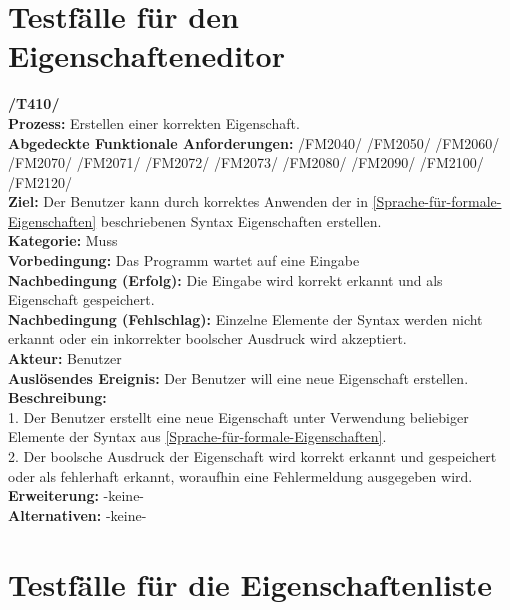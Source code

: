 \documentclass[a4paper]{scrreprt}
\begin{document}
\section{Testfälle für den Eigenschafteneditor}
\textbf{/T410/} \\
\textbf{Prozess:} Erstellen einer korrekten Eigenschaft. \\
\textbf{Abgedeckte Funktionale Anforderungen:} /FM2040/ /FM2050/ /FM2060/ /FM2070/ /FM2071/ /FM2072/ /FM2073/ /FM2080/ /FM2090/ /FM2100/ /FM2120/ \\
\textbf{Ziel:} Der Benutzer kann durch korrektes Anwenden der in \ref{Sprache-für-formale-Eigenschaften} beschriebenen Syntax Eigenschaften erstellen. \\
\textbf{Kategorie:} Muss\\
\textbf{Vorbedingung:} Das Programm wartet auf eine Eingabe\\
\textbf{Nachbedingung (Erfolg):} Die Eingabe wird korrekt erkannt und als Eigenschaft gespeichert. \\
\textbf{Nachbedingung (Fehlschlag):} Einzelne Elemente der Syntax werden nicht erkannt oder ein inkorrekter boolscher Ausdruck wird akzeptiert. \\
\textbf{Akteur:} Benutzer \\
\textbf{Auslösendes Ereignis:} Der Benutzer will eine neue Eigenschaft erstellen. \\
\textbf{Beschreibung:} \\
1. Der Benutzer erstellt eine neue Eigenschaft unter Verwendung beliebiger Elemente der Syntax aus \ref{Sprache-für-formale-Eigenschaften}. \\
2. Der boolsche Ausdruck der Eigenschaft wird korrekt erkannt und gespeichert oder als fehlerhaft erkannt, woraufhin eine Fehlermeldung ausgegeben wird. \\
\textbf {Erweiterung:} -keine- \\
\textbf {Alternativen:} -keine- \\

\section{Testfälle für die Eigenschaftenliste}
\end{document}
